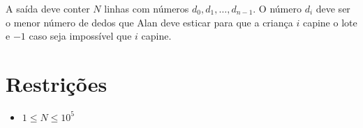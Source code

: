 A saída deve conter $N$ linhas com números $d_0, d_1, \ldots, d_{n - 1}$. O número $d_i$ deve ser o menor número de dedos que Alan deve esticar para que a criança $i$ capine o lote e $-1$ caso seja impossível que $i$ capine.

\section*{Restrições}

\begin{itemize}
\item $1 \leq N \leq 10^5$
\end{itemize}

\exemplo
